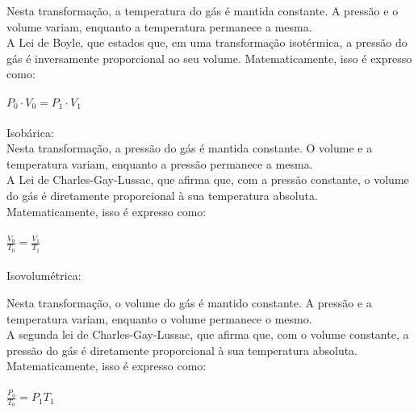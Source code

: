 \documentclass[a4paper,14pt]{article}
\begin{document}
	Nesta transformação, a temperatura do gás é mantida constante. A pressão e o volume variam, enquanto a temperatura permanece a mesma. \\
	A Lei de Boyle, que estados que, em uma transformação isotérmica, a pressão do gás é inversamente proporcional ao seu volume. Matematicamente, isso é expresso como: \\\\
	$P_0 \cdot V_0 = P_1 \cdot V_1$ \\\\
	
	\noindent Isobárica:  \\
	
	\noindent Nesta transformação, a pressão do gás é mantida constante. O volume e a temperatura variam, enquanto a pressão permanece a mesma. \\
	A Lei de Charles-Gay-Lussac, que afirma que, com a pressão constante, o volume do gás é diretamente proporcional à sua temperatura absoluta. Matematicamente, isso é expresso como: \\\\
	$\frac{V_0}{T_0} = \frac{V_1}{T_1}$ \\\\
	
	
	\noindent Isovolumétrica:
	
	\noindent Nesta transformação, o volume do gás é mantido constante. A pressão e a temperatura variam, enquanto o volume permanece o mesmo. \\
	 A segunda lei de Charles-Gay-Lussac, que afirma que, com o volume constante, a pressão do gás é diretamente proporcional à sua temperatura absoluta. Matematicamente, isso é expresso como: \\\\
	 $\frac{P_0}{T_0} = {P_1}{T_1}$ \\\\
\end{document}
